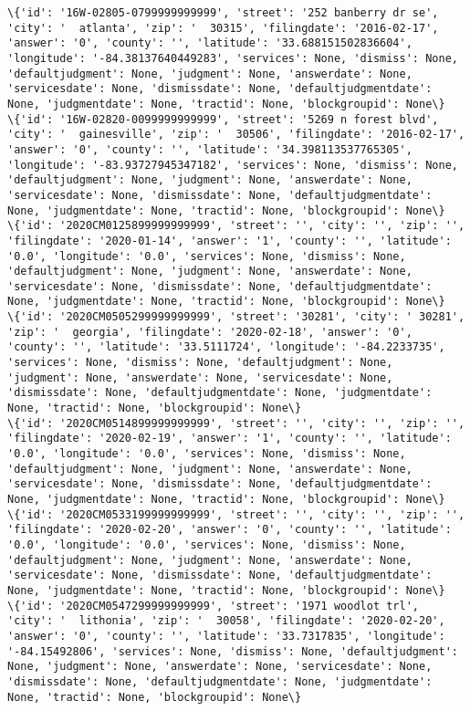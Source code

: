 \documentclass[11pt]{article}
\begin{document}
\begin{Verbatim}[commandchars=\\\{\}]
\{'id': '16W-02805-0799999999999', 'street': '252 banberry dr se', 'city': '  atlanta', 'zip': '  30315', 'filingdate': '2016-02-17', 'answer': '0', 'county': '', 'latitude': '33.688151502836604', 'longitude': '-84.38137640449283', 'services': None, 'dismiss': None, 'defaultjudgment': None, 'judgment': None, 'answerdate': None, 'servicesdate': None, 'dismissdate': None, 'defaultjudgmentdate': None, 'judgmentdate': None, 'tractid': None, 'blockgroupid': None\}
\{'id': '16W-02820-0099999999999', 'street': '5269 n forest blvd', 'city': '  gainesville', 'zip': '  30506', 'filingdate': '2016-02-17', 'answer': '0', 'county': '', 'latitude': '34.398113537765305', 'longitude': '-83.93727945347182', 'services': None, 'dismiss': None, 'defaultjudgment': None, 'judgment': None, 'answerdate': None, 'servicesdate': None, 'dismissdate': None, 'defaultjudgmentdate': None, 'judgmentdate': None, 'tractid': None, 'blockgroupid': None\}
\{'id': '2020CM0125899999999999', 'street': '', 'city': '', 'zip': '', 'filingdate': '2020-01-14', 'answer': '1', 'county': '', 'latitude': '0.0', 'longitude': '0.0', 'services': None, 'dismiss': None, 'defaultjudgment': None, 'judgment': None, 'answerdate': None, 'servicesdate': None, 'dismissdate': None, 'defaultjudgmentdate': None, 'judgmentdate': None, 'tractid': None, 'blockgroupid': None\}
\{'id': '2020CM0505299999999999', 'street': '30281', 'city': ' 30281', 'zip': '  georgia', 'filingdate': '2020-02-18', 'answer': '0', 'county': '', 'latitude': '33.5111724', 'longitude': '-84.2233735', 'services': None, 'dismiss': None, 'defaultjudgment': None, 'judgment': None, 'answerdate': None, 'servicesdate': None, 'dismissdate': None, 'defaultjudgmentdate': None, 'judgmentdate': None, 'tractid': None, 'blockgroupid': None\}
\{'id': '2020CM0514899999999999', 'street': '', 'city': '', 'zip': '', 'filingdate': '2020-02-19', 'answer': '1', 'county': '', 'latitude': '0.0', 'longitude': '0.0', 'services': None, 'dismiss': None, 'defaultjudgment': None, 'judgment': None, 'answerdate': None, 'servicesdate': None, 'dismissdate': None, 'defaultjudgmentdate': None, 'judgmentdate': None, 'tractid': None, 'blockgroupid': None\}
\{'id': '2020CM0533199999999999', 'street': '', 'city': '', 'zip': '', 'filingdate': '2020-02-20', 'answer': '0', 'county': '', 'latitude': '0.0', 'longitude': '0.0', 'services': None, 'dismiss': None, 'defaultjudgment': None, 'judgment': None, 'answerdate': None, 'servicesdate': None, 'dismissdate': None, 'defaultjudgmentdate': None, 'judgmentdate': None, 'tractid': None, 'blockgroupid': None\}
\{'id': '2020CM0547299999999999', 'street': '1971 woodlot trl', 'city': '  lithonia', 'zip': '  30058', 'filingdate': '2020-02-20', 'answer': '0', 'county': '', 'latitude': '33.7317835', 'longitude': '-84.15492806', 'services': None, 'dismiss': None, 'defaultjudgment': None, 'judgment': None, 'answerdate': None, 'servicesdate': None, 'dismissdate': None, 'defaultjudgmentdate': None, 'judgmentdate': None, 'tractid': None, 'blockgroupid': None\}

\end{Verbatim}
\end{document}
